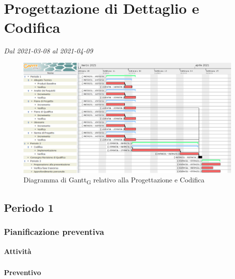 \section{Progettazione di Dettaglio e Codifica}
\textit{Dal 2021-03-08 al 2021-04-09}

\begin{figure}[H]
	\centering
	\includegraphics[scale=0.48]{res/images/gantt_fase/04_gantt_codifica_obbligatori.png}
	\caption{Diagramma di Gantt\textsubscript{G} relativo alla Progettazione e Codifica}
\end{figure}


\subsection{Periodo 1}

\subsubsection{Pianificazione preventiva}

\paragraph{Attività}
\subparagraph*{}

\planningTable{
	
}

\paragraph{Preventivo}
\subparagraph*{}


